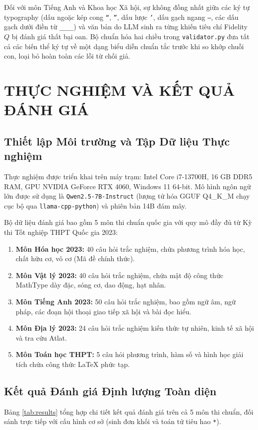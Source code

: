 \documentclass[conference]{IEEEtran}
\begin{document}
Đối với môn Tiếng Anh và Khoa học Xã hội, sự không đồng nhất giữa các ký tự typography (dấu ngoặc kép cong \texttt{“}, \texttt{”}, dấu lược \texttt{’}, dấu gạch ngang \texttt{—}, các dấu gạch dưới điền từ \texttt{\_\_\_\_}) và văn bản do LLM sinh ra từng khiến tiêu chí Fidelity $Q$ bị đánh giá thất bại oan. Bộ chuẩn hóa hai chiều trong \texttt{validator.py} đưa tất cả các biến thể ký tự về một dạng biểu diễn chuẩn tắc trước khi so khớp chuỗi con, loại bỏ hoàn toàn các lỗi từ chối giả.

\section{THỰC NGHIỆM VÀ KẾT QUẢ ĐÁNH GIÁ}
\subsection{Thiết lập Môi trường và Tập Dữ liệu Thực nghiệm}
Thực nghiệm được triển khai trên máy trạm: Intel Core i7-13700H, 16 GB DDR5 RAM, GPU NVIDIA GeForce RTX 4060, Windows 11 64-bit. Mô hình ngôn ngữ lớn được sử dụng là \texttt{Qwen2.5-7B-Instruct} (lượng tử hóa GGUF Q4\_K\_M chạy cục bộ qua \texttt{llama-cpp-python}) và phiên bản 14B đám mây.

Bộ dữ liệu đánh giá bao gồm 5 môn thi chuẩn quốc gia với quy mô đầy đủ từ Kỳ thi Tốt nghiệp THPT Quốc gia 2023:
\begin{enumerate}
    \item \textbf{Môn Hóa học 2023:} 40 câu hỏi trắc nghiệm, chứa phương trình hóa học, chất hữu cơ, vô cơ (Mã đề chính thức).
    \item \textbf{Môn Vật lý 2023:} 40 câu hỏi trắc nghiệm, chứa mật độ công thức MathType dày đặc, sóng cơ, dao động, hạt nhân.
    \item \textbf{Môn Tiếng Anh 2023:} 50 câu hỏi trắc nghiệm, bao gồm ngữ âm, ngữ pháp, các đoạn hội thoại giao tiếp xã hội và bài đọc hiểu.
    \item \textbf{Môn Địa lý 2023:} 24 câu hỏi trắc nghiệm kiến thức tự nhiên, kinh tế xã hội và tra cứu Atlat.
    \item \textbf{Môn Toán học THPT:} 5 câu hỏi phương trình, hàm số và hình học giải tích chứa công thức LaTeX phức tạp.
\end{enumerate}

\subsection{Kết quả Đánh giá Định lượng Toàn diện}
Bảng \ref{tab:results} tổng hợp chi tiết kết quả đánh giá trên cả 5 môn thi chuẩn, đối sánh trực tiếp với cấu hình cơ sở (sinh đơn khối và toán tử tiêu hao \texttt{*}).
\end{document}
